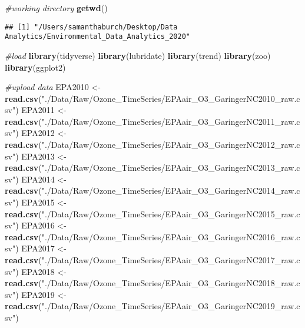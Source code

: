 \documentclass[]{article}
\newenvironment{Shaded}{\begin{snugshade}}{\end{snugshade}}
\newcommand{\CommentTok}[1]{\textcolor[rgb]{0.56,0.35,0.01}{\textit{#1}}}
\newcommand{\KeywordTok}[1]{\textcolor[rgb]{0.13,0.29,0.53}{\textbf{#1}}}
\newcommand{\NormalTok}[1]{#1}
\newcommand{\StringTok}[1]{\textcolor[rgb]{0.31,0.60,0.02}{#1}}
\begin{document}
\begin{Shaded}
\begin{Highlighting}[]
\CommentTok{#working directory}
\KeywordTok{getwd}\NormalTok{()}
\end{Highlighting}
\end{Shaded}

\begin{verbatim}
## [1] "/Users/samanthaburch/Desktop/Data Analytics/Environmental_Data_Analytics_2020"
\end{verbatim}

\begin{Shaded}
\begin{Highlighting}[]
\CommentTok{#load}
\KeywordTok{library}\NormalTok{(tidyverse)}
\KeywordTok{library}\NormalTok{(lubridate)}
\KeywordTok{library}\NormalTok{(trend)}
\KeywordTok{library}\NormalTok{(zoo)}
\KeywordTok{library}\NormalTok{(ggplot2)}

\CommentTok{#upload data}
\NormalTok{EPA2010 <-}\StringTok{ }\KeywordTok{read.csv}\NormalTok{(}\StringTok{"./Data/Raw/Ozone_TimeSeries/EPAair_O3_GaringerNC2010_raw.csv"}\NormalTok{)}
\NormalTok{EPA2011 <-}\StringTok{ }\KeywordTok{read.csv}\NormalTok{(}\StringTok{"./Data/Raw/Ozone_TimeSeries/EPAair_O3_GaringerNC2011_raw.csv"}\NormalTok{)}
\NormalTok{EPA2012 <-}\StringTok{ }\KeywordTok{read.csv}\NormalTok{(}\StringTok{"./Data/Raw/Ozone_TimeSeries/EPAair_O3_GaringerNC2012_raw.csv"}\NormalTok{)}
\NormalTok{EPA2013 <-}\StringTok{ }\KeywordTok{read.csv}\NormalTok{(}\StringTok{"./Data/Raw/Ozone_TimeSeries/EPAair_O3_GaringerNC2013_raw.csv"}\NormalTok{)}
\NormalTok{EPA2014 <-}\StringTok{ }\KeywordTok{read.csv}\NormalTok{(}\StringTok{"./Data/Raw/Ozone_TimeSeries/EPAair_O3_GaringerNC2014_raw.csv"}\NormalTok{)}
\NormalTok{EPA2015 <-}\StringTok{ }\KeywordTok{read.csv}\NormalTok{(}\StringTok{"./Data/Raw/Ozone_TimeSeries/EPAair_O3_GaringerNC2015_raw.csv"}\NormalTok{)}
\NormalTok{EPA2016 <-}\StringTok{ }\KeywordTok{read.csv}\NormalTok{(}\StringTok{"./Data/Raw/Ozone_TimeSeries/EPAair_O3_GaringerNC2016_raw.csv"}\NormalTok{)}
\NormalTok{EPA2017 <-}\StringTok{ }\KeywordTok{read.csv}\NormalTok{(}\StringTok{"./Data/Raw/Ozone_TimeSeries/EPAair_O3_GaringerNC2017_raw.csv"}\NormalTok{)}
\NormalTok{EPA2018 <-}\StringTok{ }\KeywordTok{read.csv}\NormalTok{(}\StringTok{"./Data/Raw/Ozone_TimeSeries/EPAair_O3_GaringerNC2018_raw.csv"}\NormalTok{)}
\NormalTok{EPA2019 <-}\StringTok{ }\KeywordTok{read.csv}\NormalTok{(}\StringTok{"./Data/Raw/Ozone_TimeSeries/EPAair_O3_GaringerNC2019_raw.csv"}\NormalTok{)}
\end{Highlighting}
\end{Shaded}
\end{document}

